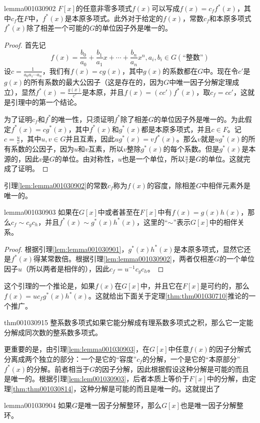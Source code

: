 \begin{lemma}{}{lemma001030902}
$F[x]$的任意非零多项式$f(x)$可以写成$f(x)=c_ff^*(x)$，其中$c_f$在$F$中，$f^*(x)$是本原多项式。此外对于给定的$f(x)$，常数$c_f$和本原多项式$f^*(x)$除了相差一个可能的$G$的单位因子外是唯一的。
\end{lemma}

\begin{proof}
首先记
\[
f(x)=\frac{b_0}{a_0} + \frac{b_1}{a_1}x + \cdots + \frac{b_n}{a_n}x^n, a_i, b_i \in G(\text{“整数”})
\]
设$c = \frac{1}{a_0a_1\cdots{}a_n}$，我们有$f(x)=cg(x)$，其中$g(x)$的系数都在$G$中。现在令$c'$是$g(x)$的所有系数的最大公因子（这是存在的，因为$G$中唯一因子分解定理成立），显然$f^*(x)=\frac{g(x)}{c'}$是本原，并且$f(x)=(cc')f^*(x)$，取$c_f=cc'$，这就是引理中的第一个结论。

为了证明$c_f$和$f^*$的唯一性，只须证明$f^*$除了相差$G$的单位因子外是唯一的。为此假定$f^*(x)=cg^*(x)$，其中$f^*(x)$和$g^*(x)$都是本原多项式，并且$c \in F$。记$c = \frac{u}{v}$，其中$u, v \in G$并且互素，因此$ug^*(x)=vf^*(x)$。那么$v$就是$ug^*(x)$的所有系数的公因子，因为$u$和$v$互素，所以$v$整除$g^*(x)$的每个系数。但是$g^*(x)$是本源的，因此$v$是$G$的单位。由对称性，$u$也是一个单位，所以$\frac{u}{v}$是$G$的单位。这就完成了证明。
\end{proof}

引理\ref{lem:lemma001030902}的常数$c_f$称为$f(x)$的容度，除相差$G$中相伴元素外是唯一的。

\begin{lemma}{}{lemma001030903}
如果在$G[x]$中或者甚至在$F[x]$中有$f(x)=g(x)h(x)$，那么$c_f \sim c_gc_h$，并且$f^*(x) \sim g^*(x)h^*(x)$，这里的“$\sim$”表示$G[x]$中的相伴关系。
\end{lemma}

\begin{proof}
根据引理\ref{lem:lemma001030901}，$g^*(x)h^*(x)$是本原多项式，显然它还是$f^*(x)$得某常数倍。根据引理\ref{lem:lemma001030902}，两者仅相差$G$的一个单位因子$u$（所以两者是相伴的），因此$c_f = u^{-1}c_gc_h$。
\end{proof}

这个引理的一个推论是，如果$f(x)$在$G[x]$中，并且它在$F[x]$是可约的，那么$f(x)=uc_fg^*(x)h^*(x)$。这就给出下面关于定理\ref{thm:thm001030710}推论的一个推广。
\begin{theorem}{}{thm001030915}
整系数多项式如果它能分解成有理系数多项式之积，那么它一定能分解成同次数的整系数多项式。
\end{theorem}

更重要的是，由引理\ref{lem:lemma001030903}，在$G[x]$中任意$f(x)$的因子分解式分离成两个独立的部分：一个是它的“容度”$c_f$的分解，一个是它的“本原部分”$f^*(x)$的分解。前者相当于$G$的因子分解，因此根据假设这种分解是可能的而且是唯一的。根据引理\ref{lem:lem001030903}，后者本质上等价于$F[x]$中的分解，由定理\ref{thm:thm001030814}，这种分解是可能的而且是唯一的。这就提出了
\begin{lemma}{}{lemma001030904}
如果$G$是唯一因子分解整环，那么$G[x]$也是唯一因子分解整环。
\end{lemma}

